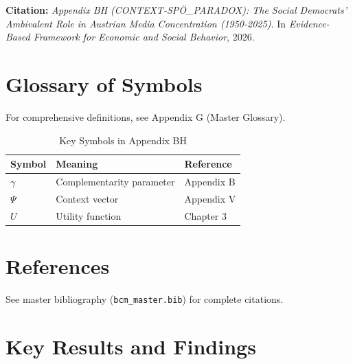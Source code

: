 {\begin{tcolorbox}[colback=orange!5!white, colframe=orange!75!black,
    title=Cross-Reference Links]
\textbf{Citation:}
\textit{Appendix BH (CONTEXT-SPÖ_PARADOX): The Social Democrats' Ambivalent Role in Austrian Media Concentration (1950-2025).}
In \textit{Evidence-Based Framework for Economic and Social Behavior}, 2026.

\end{tcolorbox}



\section{Glossary of Symbols}
\label{sec:bh-glossary}

For comprehensive definitions, see Appendix G (Master Glossary).

\begin{table}[htbp]
\centering
\caption{Key Symbols in Appendix BH}
\begin{tabular}{lll}
\toprule
\textbf{Symbol} & \textbf{Meaning} & \textbf{Reference} \\
\midrule
$\gamma$ & Complementarity parameter & Appendix B \\
$\Psi$ & Context vector & Appendix V \\
$U$ & Utility function & Chapter 3 \\
\bottomrule
\end{tabular}
\end{table}


\section{References}
\label{sec:references}

See master bibliography (\texttt{bcm\_master.bib}) for complete citations.

\nocite{bcm_master}



\section{Key Results and Findings}
\label{sec:results}

}
